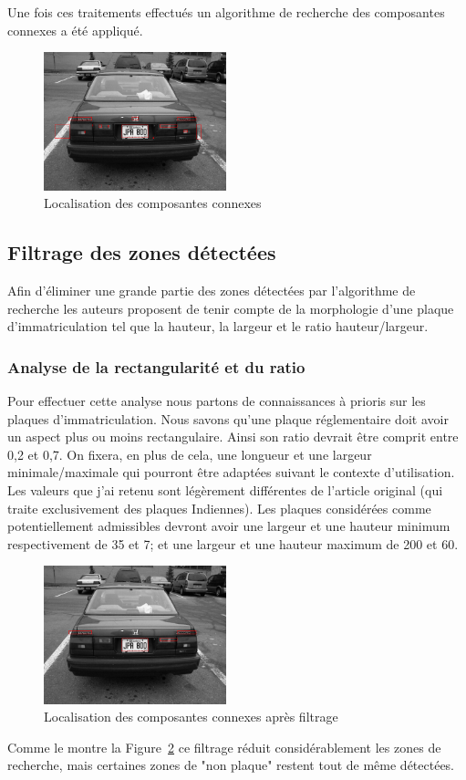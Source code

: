 \documentclass[a4paper,10pt,twocolumn]{article}
\begin{document}
Une fois ces traitements effectués un algorithme de recherche des composantes connexes a été appliqué.
\begin{figure}[H]
	\centering 
	  \includegraphics[width=200px]{img/991213-006_detect_1.png}
	\caption{Localisation des composantes connexes\label{connexes}}
\end{figure}

\subsection{Filtrage des zones détectées}
Afin d'éliminer une grande partie des zones détectées par l'algorithme de recherche les auteurs proposent de tenir compte de la morphologie d'une plaque d'immatriculation tel que la hauteur, la largeur et le ratio hauteur/largeur.

\subsubsection{Analyse de la rectangularité et du ratio} 
Pour effectuer cette analyse nous partons de connaissances à prioris sur les plaques d'immatriculation. Nous savons qu'une plaque réglementaire doit avoir un aspect plus ou moins rectangulaire. Ainsi son ratio devrait être comprit entre 0,2 et 0,7. On fixera, en plus de cela, une longueur et une largeur minimale/maximale qui pourront être adaptées suivant le contexte d'utilisation. Les valeurs que j'ai retenu sont légèrement différentes de l'article original (qui traite exclusivement des plaques Indiennes). Les plaques considérées comme potentiellement admissibles devront avoir une largeur et une hauteur minimum respectivement de 35 et 7; et une largeur et une hauteur maximum de 200 et 60.
\begin{figure}[H]
	\centering 
	  \includegraphics[width=200px]{img/991213-006_detect_2.png}
	\caption{Localisation des composantes connexes après filtrage\label{connexes_2}}
\end{figure}
Comme le montre la Figure~\ref{connexes_2} ce filtrage réduit considérablement les zones de recherche, mais certaines zones de "non plaque" restent tout de même détectées.
\end{document}
